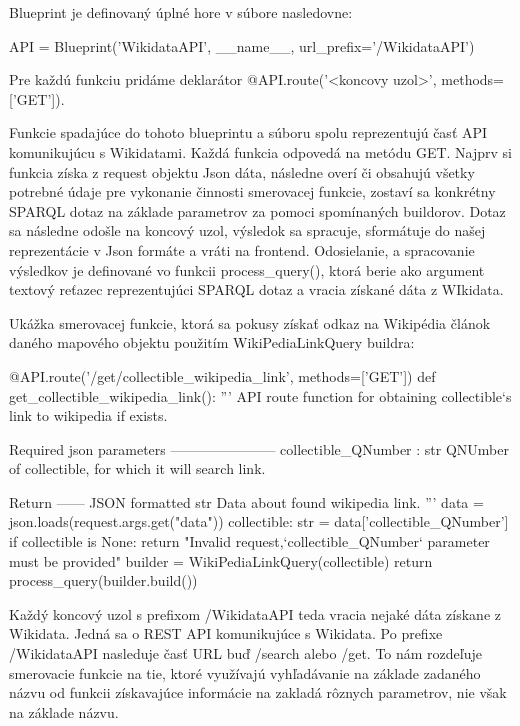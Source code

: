 Blueprint je definovaný úplné hore v súbore nasledovne: 
\begin{code}
      API = Blueprint('WikidataAPI', __name__, url_prefix='/WikidataAPI')
\end{code}

Pre každú funkciu pridáme deklarátor @API.route('<koncovy uzol>', methods=['GET']). 

Funkcie spadajúce do tohoto blueprintu a súboru spolu reprezentujú časť API komunikujúcu s Wikidatami. 
Každá funkcia odpovedá na metódu GET. Najprv si funkcia získa z request objektu Json dáta, následne overí či obsahujú všetky potrebné údaje pre vykonanie činnosti smerovacej funkcie, zostaví 
sa konkrétny SPARQL dotaz na základe parametrov za pomoci spomínaných buildorov. 
Dotaz sa následne odošle na koncový uzol, výsledok sa spracuje, sformátuje do našej reprezentácie v Json formáte a vráti na frontend. Odosielanie, a spracovanie výsledkov je definované vo funkcii 
process\_query(), ktorá berie ako argument textový reťazec reprezentujúci SPARQL dotaz a vracia získané dáta z WIkidata. 

Ukážka smerovacej funkcie, ktorá sa pokusy získať odkaz na Wikipédia článok daného mapového objektu použitím WikiPediaLinkQuery buildra: 
\begin{code}
      @API.route('/get/collectible_wikipedia_link', methods=['GET'])
      def get_collectible_wikipedia_link():
      '''
      API route function for obtaining collectible`s link 
      to wikipedia if exists.

      Required json parameters
      -----------------------
      collectible_QNumber : str
      QNUmber of collectible, for which it will search link.

      Return
      ------
      JSON formatted str
      Data about found wikipedia link.
      '''
      data = json.loads(request.args.get("data"))
      collectible: str = data['collectible_QNumber']
      if collectible is None:
      return "Invalid request,`collectible_QNumber`
      parameter must be provided"
      builder = WikiPediaLinkQuery(collectible)
      return process_query(builder.build())
\end{code}

Každý koncový uzol s prefixom /WikidataAPI teda vracia nejaké dáta získane z Wikidata. Jedná sa o REST API komunikujúce s Wikidata. 
Po prefixe /WikidataAPI nasleduje časť URL buď /search alebo /get. To nám rozdeľuje smerovacie funkcie na tie, ktoré využívajú vyhľadávanie na základe zadaného 
názvu od funkcii získavajúce informácie na zakladá rôznych parametrov, nie však na základe názvu. 

